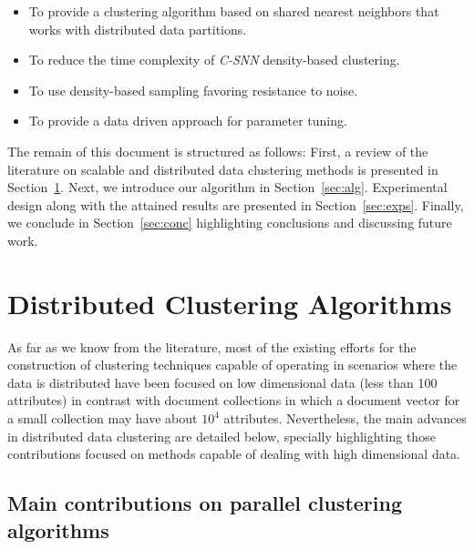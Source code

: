 \documentclass[smallextended]{svjour3}       %
\begin{document}
\begin{itemize}
\item To provide a clustering algorithm based on shared nearest neighbors that works with distributed data partitions.
\item To reduce the time complexity of \textit{C-SNN} density-based clustering.
\item To use density-based sampling favoring resistance to noise.  
\item To provide a data driven approach for parameter tuning. 
\end{itemize}


The remain of this document is structured as follows: First, a review of the literature on scalable and distributed data clustering methods is presented in Section~\ref{sec:relwork}. Next, we introduce our algorithm in Section~\ref{sec:alg}. Experimental design along with the attained results are presented in Section~\ref{sec:exps}. Finally, we conclude in Section~\ref{sec:conc} highlighting conclusions and discussing future work. 

\section{Distributed Clustering Algorithms}
\label{sec:relwork}

As far as we know from the literature, most of the existing efforts for the construction of clustering techniques capable of operating in scenarios where the data is distributed have been focused on low dimensional data (less than 100 attributes) in contrast with document collections in which a document vector for a small collection may have about $10^4$ attributes. Nevertheless, the main advances in distributed data clustering are detailed below, specially highlighting those contributions focused on methods capable of dealing with high dimensional data.

\subsection{Main contributions on parallel clustering algorithms}
\end{document}
